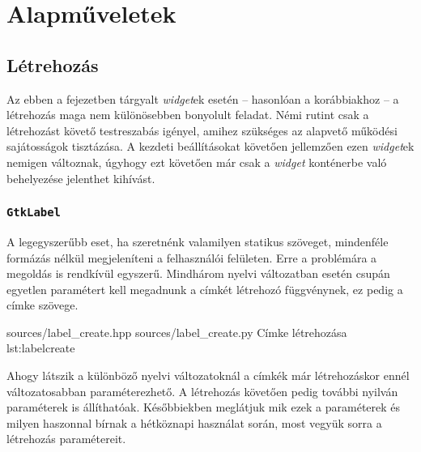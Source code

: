 \section{Alapműveletek}

\subsection{Létrehozás}

Az ebben a fejezetben tárgyalt \textit{widget}ek esetén -- hasonlóan a korábbiakhoz -- a létrehozás maga nem különösebben bonyolult feladat. Némi rutint csak a létrehozást követő testreszabás igényel, amihez szükséges az alapvető működési sajátosságok tisztázása. A kezdeti beállításokat követően jellemzően ezen \textit{widget}ek nemigen változnak, úgyhogy ezt követően már csak a \textit{widget} konténerbe való behelyezése jelenthet kihívást.

\subsubsection{\texttt{GtkLabel}}

A legegyszerűbb eset, ha szeretnénk valamilyen statikus szöveget, mindenféle formázás nélkül megjeleníteni a felhasználói felületen. Erre a problémára a megoldás is rendkívül egyszerű. Mindhárom nyelvi változatban esetén csupán egyetlen paramétert kell megadnunk a címkét létrehozó függvénynek, ez pedig a címke szövege.

{sources/label_create.hpp}
{sources/label_create.py}
{Címke létrehozása}
{lst:labelcreate}

Ahogy látszik a különböző nyelvi változatoknál a címkék már létrehozáskor ennél változatosabban paraméterezhető. A létrehozás követően pedig további nyilván paraméterek is állíthatóak.  Későbbiekben meglátjuk mik ezek a paraméterek és milyen haszonnal bírnak a hétköznapi használat során, most vegyük sorra a létrehozás paramétereit.


